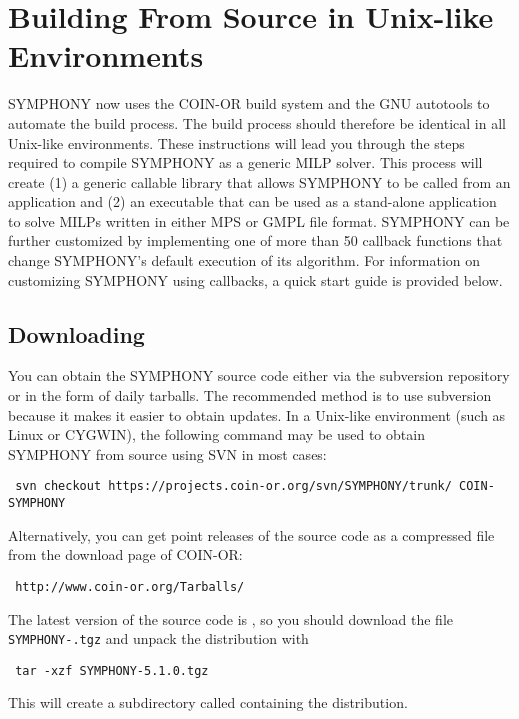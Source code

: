 

\section{Building From Source in Unix-like Environments}
\label{getting_started_unix}

SYMPHONY now uses the COIN-OR build system and the GNU autotools to automate
the build process. The build process should therefore be identical in all
Unix-like environments. These instructions will lead you through the steps
required to compile SYMPHONY as a generic MILP solver. This process will
create (1) a generic callable library that allows SYMPHONY to be called from
an application and (2) an executable that can be used as a stand-alone
application to solve MILPs written in either MPS or GMPL file format. SYMPHONY
can be further customized by implementing one of more than 50 callback
functions that change SYMPHONY's default execution of its algorithm. For
information on customizing SYMPHONY using callbacks, a quick start guide is
provided below.

\subsection{Downloading}

You can obtain the SYMPHONY source code either via the subversion repository
or in the form of daily tarballs. The recommended method is to use subversion
because it makes it easier to obtain updates. In a Unix-like environment (such
as Linux or CYGWIN), the following command may be used to obtain SYMPHONY from
source using SVN in most cases:
{\color{Brown}
\begin{verbatim}
 svn checkout https://projects.coin-or.org/svn/SYMPHONY/trunk/ COIN-SYMPHONY
\end{verbatim}
}
Alternatively, you can get point releases of the source code as a compressed
file from the download page of COIN-OR:
{\color{Brown}
\begin{verbatim}
 http://www.coin-or.org/Tarballs/
\end{verbatim}
}
The latest version of the source code is \VER, so you should download the file
{\color{Brown}\texttt{SYMPHONY-\VER.tgz}} and unpack the distribution with 
{\color{Brown}
\begin{verbatim}
 tar -xzf SYMPHONY-5.1.0.tgz
\end{verbatim}
} 
This will create a subdirectory called  containing
the distribution.

